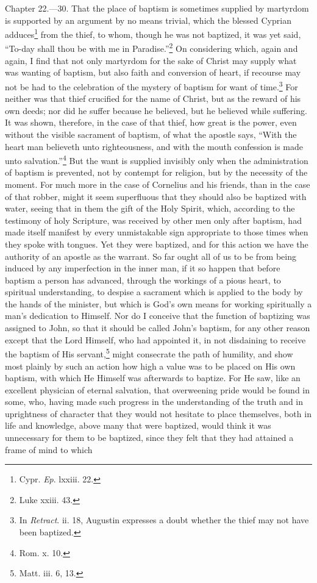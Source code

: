 Chapter 22.—30. That the place of baptism is sometimes supplied by martyrdom is supported by an argument by no means trivial, which the blessed Cyprian adduces\footnote{\par  Cypr. \emph{Ep}. lxxiii. 22.} from the thief, to whom, though he was not baptized, it was yet said, ``To-day shall thou be with me in Paradise.''\footnote{\par  Luke xxiii. 43.} On considering which, again and again, I find that not only martyrdom for the sake of Christ may supply what was wanting of baptism, but also faith and conversion of heart, if recourse may not be had to the celebration of the mystery of baptism for want of time.\footnote{\par  In \emph{Retract}. ii. 18, Augustin expresses a doubt whether the thief may not have been baptized.} For neither was that thief crucified for the name of Christ, but as the reward of his own deeds; nor did he suffer because he believed, but he believed while suffering. It was shown, therefore, in the case of that thief, how great is the power, even without the visible sacrament of baptism, of what the apostle says, ``With the heart man believeth unto righteousness, and with the mouth confession is made unto salvation.''\footnote{\par  Rom. x. 10.} But the want is supplied invisibly only when the administration of baptism is prevented, not by contempt for religion, but by the necessity of the moment. For much more in the case of Cornelius and his friends, than in the case of that robber, might it seem superfluous that they should also be baptized with water, seeing that in them the gift of the Holy Spirit, which, according to the testimony of holy Scripture, was received by other men only after baptism, had made itself manifest by every unmistakable sign appropriate to those times when they spoke with tongues. Yet they were baptized, and for this action we have the authority of an apostle as the warrant. So far ought all of us to be from being induced by any imperfection in the inner man, if it so happen that before baptism a person has advanced, through the workings of a pious heart, to spiritual understanding, to despise a sacrament which is applied to the body by the hands of the minister, but which is God’s own means for working spiritually a man’s dedication to Himself. Nor do I conceive that the function of baptizing was assigned to John, so that it should be called John’s baptism, for any other reason except that the Lord Himself, who had appointed it, in not disdaining to receive the baptism of His servant,\footnote{\par  Matt. iii. 6, 13.} might consecrate the path of humility, and show most plainly by such an action how high a value was to be placed on His own baptism, with which He Himself was afterwards to baptize. For He saw, like an excellent physician of eternal salvation, that overweening pride would be found in some, who, having made such progress in the understanding of the truth and in uprightness of character that they would not hesitate to place themselves, both in life and knowledge, above many that were baptized, would think it was unnecessary for them to be baptized, since they felt that they had attained a frame of mind to which 